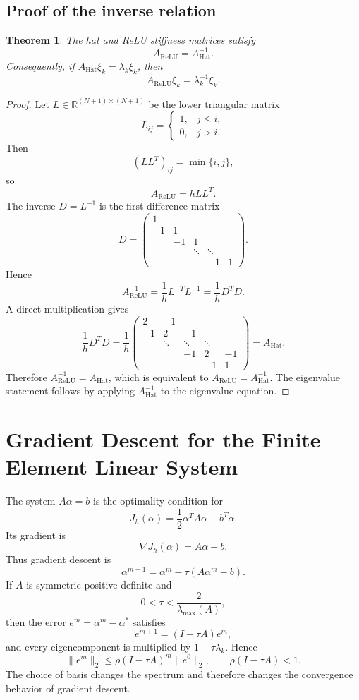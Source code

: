 \documentclass[11pt,a4paper]{article}
\newcommand{\R}{\mathbb{R}}
\newcommand{\Ah}{A_{\mathrm{Hat}}}
\newcommand{\Ar}{A_{\mathrm{ReLU}}}
\theoremstyle{definition}
\theoremstyle{plain}
\newtheorem{theorem}{Theorem}[section]
\theoremstyle{remark}
\begin{document}
\subsection{Proof of the inverse relation}
\begin{theorem}
The hat and ReLU stiffness matrices satisfy
\[
  \Ar=\Ah^{-1}.
\]
Consequently, if $\Ah\xi_k=\lambda_k\xi_k$, then
\[
  \Ar\xi_k=\lambda_k^{-1}\xi_k.
\]
\end{theorem}

\begin{proof}
Let $L\in\R^{(N+1)\times(N+1)}$ be the lower triangular matrix
\[
  L_{ij}=\begin{cases}1,&j\le i,\\0,&j>i.\end{cases}
\]
Then
\[
  (LL^T)_{ij}=\min\{i,j\},
\]
so
\[
  \Ar=hLL^T.
\]
The inverse $D=L^{-1}$ is the first-difference matrix
\[
  D=
  \begin{pmatrix}
    1&&&&\\
    -1&1&&&\\
    &-1&1&&\\
    &&\ddots&\ddots&\\
    &&&-1&1
  \end{pmatrix}.
\]
Hence
\[
  \Ar^{-1}=\frac1hL^{-T}L^{-1}=\frac1hD^TD.
\]
A direct multiplication gives
\[
  \frac1hD^TD
  =\frac1h
  \begin{pmatrix}
    2&-1&&&\\
    -1&2&-1&&\\
    &\ddots&\ddots&\ddots&\\
    &&-1&2&-1\\
    &&&-1&1
  \end{pmatrix}
  =\Ah.
\]
Therefore $\Ar^{-1}=\Ah$, which is equivalent to $\Ar=\Ah^{-1}$. The eigenvalue statement follows by applying $\Ah^{-1}$ to the eigenvalue equation.
\end{proof}

\section{Gradient Descent for the Finite Element Linear System}

The system $A\alpha=b$ is the optimality condition for
\[
  J_h(\alpha)=\frac12\alpha^TA\alpha-b^T\alpha.
\]
Its gradient is
\[
  \nabla J_h(\alpha)=A\alpha-b.
\]
Thus gradient descent is
\[
  \alpha^{m+1}=\alpha^m-\tau(A\alpha^m-b).
\]
If $A$ is symmetric positive definite and
\[
  0<\tau<\frac{2}{\lambda_{\max}(A)},
\]
then the error $e^m=\alpha^m-\alpha^*$ satisfies
\[
  e^{m+1}=(I-\tau A)e^m,
\]
and every eigencomponent is multiplied by $1-\tau\lambda_k$. Hence
\[
  \|e^m\|_2\le \rho(I-\tau A)^m\|e^0\|_2,
  \qquad \rho(I-\tau A)<1.
\]
The choice of basis changes the spectrum and therefore changes the convergence behavior of gradient descent.
\end{document}
